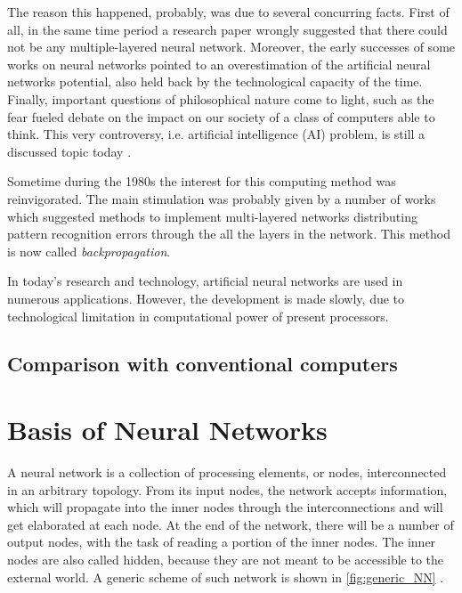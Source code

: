 The reason this happened, probably, was due to several concurring facts.
First of all, in the same time period a research paper wrongly suggested that there could not be any multiple-layered neural network.
Moreover, the early successes of some works on neural networks pointed to an overestimation of the artificial neural networks potential, also held back by the technological capacity of the time.
Finally, important questions of philosophical nature come to light, such as the fear fueled debate on the impact on our society of a class of computers able to think.
This very controversy, i.e. artificial intelligence (AI) problem, is still a discussed topic today \cite{stanford.edu}.

Sometime during the 1980s the interest for this computing method was reinvigorated.
The main stimulation was probably given by a number of works which suggested methods to implement multi-layered networks distributing pattern recognition errors through the all the layers in the network.
This method is now called \textit{backpropagation}.

In today's research and technology, artificial neural networks are used in numerous applications.
However, the development is made slowly, due to technological limitation in computational power of present processors.

\subsection{Comparison with conventional computers}
\label{ssec:Comparison_with_conventional_computers}


\section{Basis of Neural Networks}
\label{sec:Basis_of_Neural_Networks}

A neural network is a collection of processing elements, or nodes, interconnected in an arbitrary topology.
From its input nodes, the network accepts information, which will propagate into the inner nodes through the interconnections and will get elaborated at each node.
At the end of the network, there will be a number of output nodes, with the task of reading a portion of the inner nodes.
The inner nodes are also called hidden, because they are not meant to be accessible to the external world.
A generic scheme of such network is shown in \autoref{fig:generic_NN} .

